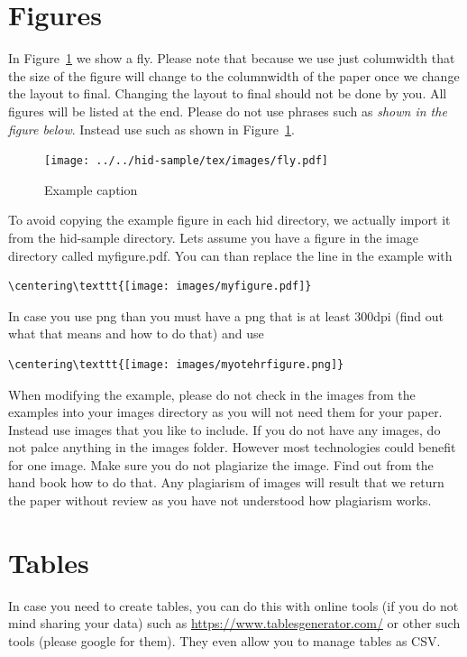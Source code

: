 \section{Figures}

In Figure~\ref{f:fly} we show a fly. Please note that because we use
just columwidth that the size of the figure will change to the
columnwidth of the paper once we change the layout to final. Changing
the layout to final should not be done by you. All figures will be
listed at the end.  Please do not use phrases such as \textit{shown in
  the figure below}. Instead use such as shown in Figure~\ref{f:fly}.

\begin{figure}[!ht]
  \centering\texttt{[image: ../../hid-sample/tex/images/fly.pdf]}
  \caption{Example caption}\label{f:fly}
\end{figure}

To avoid copying the example figure in each hid directory, we actually
import it from the hid-sample directory. Lets assume you have a figure
in the image directory called myfigure.pdf. You can than replace the
line in the example with

\begin{verbatim}
\centering\texttt{[image: images/myfigure.pdf]}
\end{verbatim}

In case you use png than you must have a png that is at least 300dpi
(find out what that means and how to do that) and use 

\begin{verbatim}
\centering\texttt{[image: images/myotehrfigure.png]}
\end{verbatim}

When modifying the example, please do not check in the images from the
examples into your images directory as you will not need them for your
paper. Instead use images that you like to include. If you do not have
any images, do not palce anything in the images folder. However most
technologies could benefit for one image. Make sure you do not
plagiarize the image. Find out from the hand book how to do that. Any
plagiarism of images will result that we return the paper without
review as you have not understood how plagiarism works.

\section{Tables}

In case you need to create tables, you can do this with online tools
(if you do not mind sharing your data) such as
\url{https://www.tablesgenerator.com/} or other such tools (please
google for them). They even allow you to manage tables as CSV.

